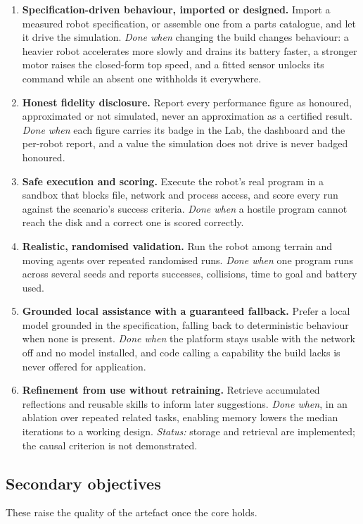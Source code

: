 \documentclass[11pt,a4paper]{report}
\begin{document}
\begin{enumerate}[label=O\arabic*.]
\item {} \textbf{Specification-driven behaviour, imported or designed.} Import a measured robot specification, or assemble one from a parts catalogue, and let it drive the simulation. \emph{Done when} changing the build changes behaviour: a heavier robot accelerates more slowly and drains its battery faster, a stronger motor raises the closed-form top speed, and a fitted sensor unlocks its command while an absent one withholds it everywhere.
\item {} \textbf{Honest fidelity disclosure.} Report every performance figure as honoured, approximated or not simulated, never an approximation as a certified result. \emph{Done when} each figure carries its badge in the Lab, the dashboard and the per-robot report, and a value the simulation does not drive is never badged honoured.
\item {} \textbf{Safe execution and scoring.} Execute the robot's real program in a sandbox that blocks file, network and process access, and score every run against the scenario's success criteria. \emph{Done when} a hostile program cannot reach the disk and a correct one is scored correctly.
\item {} \textbf{Realistic, randomised validation.} Run the robot among terrain and moving agents over repeated randomised runs. \emph{Done when} one program runs across several seeds and reports successes, collisions, time to goal and battery used.
\item {} \textbf{Grounded local assistance with a guaranteed fallback.} Prefer a local model grounded in the specification, falling back to deterministic behaviour when none is present. \emph{Done when} the platform stays usable with the network off and no model installed, and code calling a capability the build lacks is never offered for application.
\item {} \textbf{Refinement from use without retraining.} Retrieve accumulated reflections and reusable skills to inform later suggestions. \emph{Done when}, in an ablation over repeated related tasks, enabling memory lowers the median iterations to a working design. \emph{Status:} storage and retrieval are implemented; the causal criterion is not demonstrated.
\end{enumerate}

\subsection{Secondary objectives}
These raise the quality of the artefact once the core holds.
\end{document}
